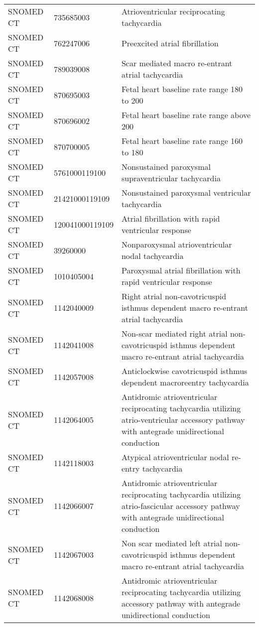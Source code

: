 \begin{longtable}{p{}p{}p{}}
  SNOMED CT & 735685003 & Atrioventricular reciprocating tachycardia \\ 
  SNOMED CT & 762247006 & Preexcited atrial fibrillation \\ 
  SNOMED CT & 789039008 & Scar mediated macro re-entrant atrial tachycardia \\ 
  SNOMED CT & 870695003 & Fetal heart baseline rate range 180 to 200 \\ 
  SNOMED CT & 870696002 & Fetal heart baseline rate range above 200 \\ 
  SNOMED CT & 870700005 & Fetal heart baseline rate range 160 to 180 \\ 
  SNOMED CT & 5761000119100 & Nonsustained paroxysmal supraventricular tachycardia \\ 
  SNOMED CT & 21421000119109 & Nonsustained paroxysmal ventricular tachycardia \\ 
  SNOMED CT & 120041000119109 & Atrial fibrillation with rapid ventricular response \\ 
  SNOMED CT & 39260000 & Nonparoxysmal atrioventricular nodal tachycardia \\ 
  SNOMED CT & 1010405004 & Paroxysmal atrial fibrillation with rapid ventricular response \\ 
  SNOMED CT & 1142040009 & Right atrial non-cavotricuspid isthmus dependent macro re-entrant atrial tachycardia \\ 
  SNOMED CT & 1142041008 & Non-scar mediated right atrial non-cavotricuspid isthmus dependent macro re-entrant atrial tachycardia \\ 
  SNOMED CT & 1142057008 & Anticlockwise cavotricuspid isthmus dependent macroreentry tachycardia \\ 
  SNOMED CT & 1142064005 & Antidromic atrioventricular reciprocating tachycardia utilizing atrio-ventricular accessory pathway with antegrade unidirectional conduction \\ 
  SNOMED CT & 1142118003 & Atypical atrioventricular nodal re-entry tachycardia \\ 
  SNOMED CT & 1142066007 & Antidromic atrioventricular reciprocating tachycardia utilizing atrio-fascicular accessory pathway with antegrade unidirectional conduction \\ 
  SNOMED CT & 1142067003 & Non scar mediated left atrial non-cavotricuspid isthmus dependent macro re-entrant atrial tachycardia \\ 
  SNOMED CT & 1142068008 & Antidromic atrioventricular reciprocating tachycardia utilizing accessory pathway with antegrade unidirectional conduction \\ 

\end{longtable}
